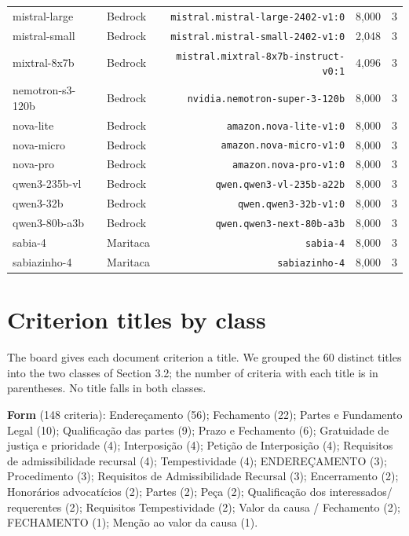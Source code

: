 \documentclass{IOS-Book-Article}
\begin{document}
\begin{table}[!ht]
\begin{tabular}{llrrr}
mistral-large & Bedrock & \texttt{mistral.mistral-large-2402-v1:0} & 8,000 & 3 \\
mistral-small & Bedrock & \texttt{mistral.mistral-small-2402-v1:0} & 2,048 & 3 \\
mixtral-8x7b & Bedrock & \texttt{mistral.mixtral-8x7b-instruct-v0:1} & 4,096 & 3 \\
nemotron-s3-120b & Bedrock & \texttt{nvidia.nemotron-super-3-120b} & 8,000 & 3 \\
nova-lite & Bedrock & \texttt{amazon.nova-lite-v1:0} & 8,000 & 3 \\
nova-micro & Bedrock & \texttt{amazon.nova-micro-v1:0} & 8,000 & 3 \\
nova-pro & Bedrock & \texttt{amazon.nova-pro-v1:0} & 8,000 & 3 \\
qwen3-235b-vl & Bedrock & \texttt{qwen.qwen3-vl-235b-a22b} & 8,000 & 3 \\
qwen3-32b & Bedrock & \texttt{qwen.qwen3-32b-v1:0} & 8,000 & 3 \\
qwen3-80b-a3b & Bedrock & \texttt{qwen.qwen3-next-80b-a3b} & 8,000 & 3 \\
sabia-4 & Maritaca & \texttt{sabia-4} & 8,000 & 3 \\
sabiazinho-4 & Maritaca & \texttt{sabiazinho-4} & 8,000 & 3 \\
\hline
\end{tabular}
\end{table}


\section{Criterion titles by class}

The board gives each document criterion a title. We grouped the 60 distinct titles into the two classes of Section 3.2; the number of criteria with each title is in parentheses. No title falls in both classes.

\textbf{Form} (148 criteria): Endereçamento (56); Fechamento (22); Partes e Fundamento Legal (10); Qualificação das partes (9); Prazo e Fechamento (6); Gratuidade de justiça e prioridade (4); Interposição (4); Petição de Interposição (4); Requisitos de admissibilidade recursal (4); Tempestividade (4); ENDEREÇAMENTO (3); Procedimento (3); Requisitos de Admissibilidade Recursal (3); Encerramento (2); Honorários advocatícios (2); Partes (2); Peça (2); Qualificação dos interessados/ requerentes (2); Requisitos Tempestividade (2); Valor da causa / Fechamento (2); FECHAMENTO (1); Menção ao valor da causa (1).
\end{document}
